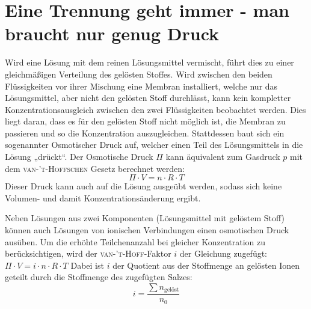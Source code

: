 \documentclass[../kl10.tex]{subfiles}
\begin{document}
\section{Eine Trennung geht immer - man braucht nur genug Druck}

Wird eine Lösung mit dem reinen Lösungsmittel vermischt, führt dies zu einer gleichmäßigen Verteilung des gelösten Stoffes. 
Wird zwischen den beiden Flüssigkeiten vor ihrer Mischung eine Membran installiert, welche nur das Lösungsmittel, aber nicht den gelösten Stoff durchlässt, kann kein kompletter Konzentrationsausgleich zwischen den zwei Flüssigkeiten beobachtet werden. Dies liegt daran, dass es für den gelösten Stoff nicht möglich ist, die Membran zu passieren und so die Konzentration auszugleichen. Stattdessen baut sich ein sogenannter Osmotischer Druck auf, welcher einen Teil des Lösungsmittels in die Lösung „drückt“. 
Der Osmotische Druck $\Pi$ kann äquivalent zum Gasdruck $p$ mit dem \textsc{van-’t-Hoffschen} Gesetz berechnet werden:
$$\Pi \cdot V =n \cdot R \cdot T $$
Dieser Druck kann auch auf die Lösung ausgeübt werden, sodass sich keine Volumen- und damit Konzentrationsänderung ergibt. 

Neben Lösungen aus zwei Komponenten (Lösungsmittel mit gelöstem Stoff) können auch Lösungen von ionischen Verbindungen einen osmotischen Druck ausüben. Um die erhöhte Teilchenanzahl bei gleicher Konzentration zu berücksichtigen, wird der \textsc{van-’t-Hoff}-Faktor $i$ der Gleichung zugefügt: 
$\Pi \cdot V =i \cdot n \cdot R \cdot T $
Dabei ist $i$ der Quotient aus der Stoffmenge an gelösten Ionen geteilt durch die Stoffmenge des zugefügten Salzes: $$i= \frac{\sum{n_\text{gelöst}}}{n_0}$$

\end{document}
